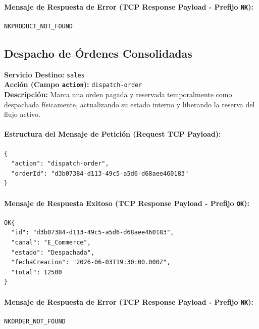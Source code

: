 \documentclass[12pt,a4paper]{article}
\begin{document}
\paragraph{Mensaje de Respuesta de Error (TCP Response Payload - Prefijo \texttt{NK}):}
\begin{verbatim}
NKPRODUCT_NOT_FOUND
\end{verbatim}

\subsection{Despacho de Órdenes Consolidadas}
\textbf{Servicio Destino:} \texttt{sales} \\
\textbf{Acción (Campo \texttt{action}):} \texttt{dispatch-order} \\
\textbf{Descripción:} Marca una orden pagada y reservada temporalmente como despachada físicamente, actualizando su estado interno y liberando la reserva del flujo activo.

\paragraph{Estructura del Mensaje de Petición (Request TCP Payload):}
\begin{verbatim}
{
  "action": "dispatch-order",
  "orderId": "d3b07384-d113-49c5-a5d6-d68aee460183"
}
\end{verbatim}

\paragraph{Mensaje de Respuesta Exitoso (TCP Response Payload - Prefijo \texttt{OK}):}
\begin{verbatim}
OK{
  "id": "d3b07384-d113-49c5-a5d6-d68aee460183",
  "canal": "E_Commerce",
  "estado": "Despachada",
  "fechaCreacion": "2026-06-03T19:30:00.000Z",
  "total": 12500
}
\end{verbatim}

\paragraph{Mensaje de Respuesta de Error (TCP Response Payload - Prefijo \texttt{NK}):}
\begin{verbatim}
NKORDER_NOT_FOUND
\end{verbatim}
\end{document}

